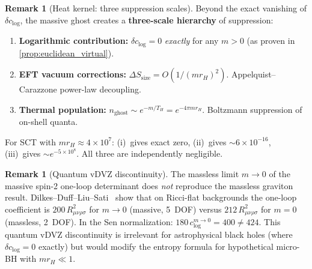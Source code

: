 \documentclass[11pt,a4paper]{article}
\theoremstyle{plain}
\theoremstyle{definition}
\newtheorem{remark}[theorem]{Remark}
\begin{document}
\begin{remark}[Heat kernel: three suppression scales]%
\label{rem:heat_kernel}
  Beyond the exact vanishing of $\delta c_{\log}$, the massive ghost
  creates a \textbf{three-scale hierarchy} of suppression:
  \begin{enumerate}[label=(\roman*)]
    \item \textbf{Logarithmic contribution:} $\delta c_{\log} = 0$
      \emph{exactly} for any $m > 0$ (as proven in
      \cref{prop:euclidean_virtual}).
    \item \textbf{EFT vacuum corrections:}
      $\Delta S_{\mathrm{size}} = O(1/(mr_H)^2)$.
      Appelquist--Carazzone power-law decoupling.
    \item \textbf{Thermal population:}
      $n_{\mathrm{ghost}} \sim e^{-m/T_H} = e^{-4\pi m r_H}$.
      Boltzmann suppression of on-shell quanta.
  \end{enumerate}
  For SCT with $m r_H \approx 4 \times 10^7$: (i)~gives exact zero,
  (ii)~gives $\sim 6 \times 10^{-16}$, (iii)~gives
  $\sim e^{-5 \times 10^8}$.
  All three are independently negligible.
\end{remark}

\begin{remark}[Quantum vDVZ discontinuity]%
\label{rem:vDVZ}
  The massless limit $m \to 0$ of the massive spin-2 one-loop
  determinant does \emph{not} reproduce the massless graviton result.
  Dilkes--Duff--Liu--Sati~\cite{DDLS2001} show that on Ricci-flat
  backgrounds the one-loop coefficient is $200\,R_{\mu\nu\rho\sigma}^2$
  for $m \to 0$ (massive, 5~DOF) versus $212\,R_{\mu\nu\rho\sigma}^2$
  for $m = 0$ (massless, 2~DOF).  In the Sen normalization:
  $180\,c_{\log}^{m \to 0} = 400 \neq 424$.
  This quantum vDVZ discontinuity is irrelevant for astrophysical
  black holes (where $\delta c_{\log} = 0$ exactly) but would modify
  the entropy formula for hypothetical micro-BH with $m r_H \ll 1$.
\end{remark}
\end{document}
